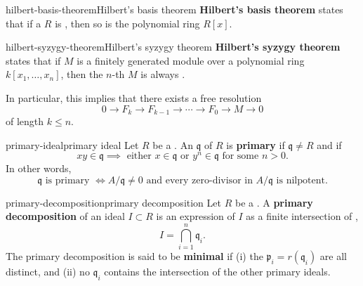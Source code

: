 \begin{topic}{hilbert-basis-theorem}{Hilbert's basis theorem}
    \textbf{Hilbert's basis theorem} states that if a  $R$ is , then so is the polynomial ring $R[x]$.
\end{topic}


\begin{topic}{hilbert-syzygy-theorem}{Hilbert's syzygy theorem}
    \textbf{Hilbert's syzygy theorem} states that if $M$ is a finitely generated module over a polynomial ring $k[x_1, \ldots, x_n]$, then the $n$-th  $M$ is always .
    
    In particular, this implies that there exists a free resolution
    \[ 0 \to F_k \to F_{k - 1} \to \cdots \to F_0 \to M \to 0 \]
    of length $k \le n$.
\end{topic}

\begin{topic}{primary-ideal}{primary ideal}
    Let $R$ be a . An  $\mathfrak{q}$ of $R$ is \textbf{primary} if $\mathfrak{q} \ne R$ and if
    \[ xy \in \mathfrak{q} \implies \text{ either } x \in \mathfrak{q} \text{ or } y^n \in \mathfrak{q} \text{ for some } n > 0 . \]
    In other words,
    \[ \mathfrak{q} \text{ is primary } \iff A / \mathfrak{q} \ne 0 \text{ and every zero-divisor in } A / \mathfrak{q} \text{ is nilpotent} . \]
\end{topic}

\begin{topic}{primary-decomposition}{primary decomposition}
    Let $R$ be a . A \textbf{primary decomposition} of an ideal $I \subset R$ is an expression of $I$ as a finite intersection of ,
    \[ I = \bigcap_{i = 1}^{n} \mathfrak{q}_i . \]
    The primary decomposition is said to be \textbf{minimal} if (i) the $\mathfrak{p}_i = r(\mathfrak{q}_i)$ are all distinct, and (ii) no $\mathfrak{q}_i$ contains the intersection of the other primary ideals.
\end{topic}

